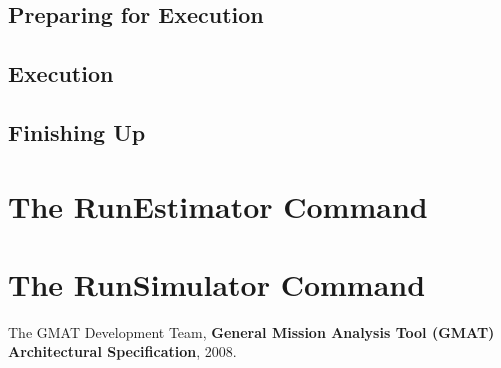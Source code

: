 \documentclass[11pt]{article}
\begin{document}
\subsection{Preparing for Execution}

\subsection{Execution}

\subsection{Finishing Up}

\section{The RunEstimator Command}

\section{The RunSimulator Command}

\begin{thebibliography}{99}


     The GMAT Development Team, \textbf{General Mission Analysis Tool (GMAT) Architectural Specification}, 2008.

\end{thebibliography}
\end{document}
